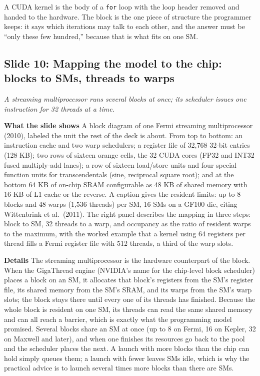 \documentclass[11pt,letterpaper]{article}
\newcommand{\slide}[3]{%
  \subsection[Slide #1: #2]{Slide #1: #2}%
  {\color{muted}\itshape #3\par}\medskip}
\newcommand{\para}[1]{\medskip\noindent\textbf{#1}\quad}
\newenvironment{intuition}{\begin{tcolorbox}[intuitionbox]}{\end{tcolorbox}}
\begin{document}
\begin{intuition}
A CUDA kernel is the body of a \texttt{for} loop with the loop header removed and handed to the hardware. The block is the one piece of structure the programmer keeps: it says which iterations may talk to each other, and the answer must be ``only these few hundred,'' because that is what fits on one SM.
\end{intuition}

\slide{10}{Mapping the model to the chip: blocks to SMs, threads to warps}{A streaming multiprocessor runs several blocks at once; its scheduler issues one instruction for 32 threads at a time.}

\para{What the slide shows} A block diagram of one Fermi streaming multiprocessor (2010), labeled the unit the rest of the deck is about. From top to bottom: an instruction cache and two warp schedulers; a register file of 32,768 32-bit entries (128 KB); two rows of sixteen orange cells, the 32 CUDA cores (FP32 and INT32 fused multiply-add lanes); a row of sixteen load/store units and four special function units for transcendentals (sine, reciprocal square root); and at the bottom 64 KB of on-chip SRAM configurable as 48 KB of shared memory with 16 KB of L1 cache or the reverse. A caption gives the resident limits: up to 8 blocks and 48 warps (1,536 threads) per SM, 16 SMs on a GF100 die, citing Wittenbrink et al.\ (2011). The right panel describes the mapping in three steps: block to SM, 32 threads to a warp, and occupancy as the ratio of resident warps to the maximum, with the worked example that a kernel using 64 registers per thread fills a Fermi register file with 512 threads, a third of the warp slots.

\para{Details} The streaming multiprocessor is the hardware counterpart of the block. When the GigaThread engine (NVIDIA's name for the chip-level block scheduler) places a block on an SM, it allocates that block's registers from the SM's register file, its shared memory from the SM's SRAM, and its warps from the SM's warp slots; the block stays there until every one of its threads has finished. Because the whole block is resident on one SM, its threads can read the same shared memory and can all reach a barrier, which is exactly what the programming model promised. Several blocks share an SM at once (up to 8 on Fermi, 16 on Kepler, 32 on Maxwell and later), and when one finishes its resources go back to the pool and the scheduler places the next. A launch with more blocks than the chip can hold simply queues them; a launch with fewer leaves SMs idle, which is why the practical advice is to launch several times more blocks than there are SMs.
\end{document}
